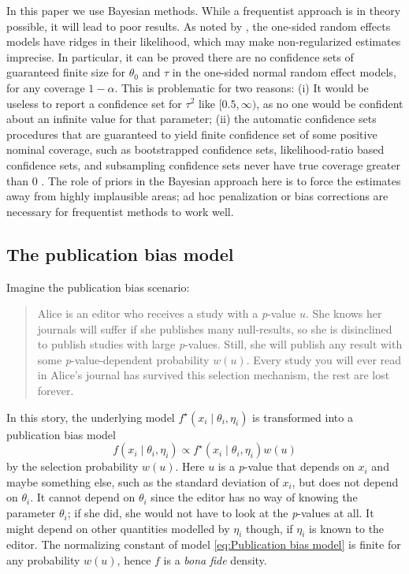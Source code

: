\documentclass{article}
\theoremstyle{plain}
\theoremstyle{definition}
\begin{document}
In this paper we use Bayesian methods. While a frequentist approach is in theory possible, it will lead to poor results. As noted by \citet[Appendix, 1]{mcshane2016adjusting}, the one-sided random effects models have ridges in their likelihood, which may make non-regularized estimates imprecise. In particular, it can be proved \citep{Moss2019} there are no confidence sets of guaranteed finite size for $\theta_{0}$ and $\tau$ in the one-sided normal random effect models, for any coverage $1-\alpha$. This is problematic for two reasons: (i) It would be useless to report a confidence set for $\tau^{2}$ like $[0.5,\infty)$, as no one would be confident about an infinite value for that parameter; (ii) the automatic confidence sets procedures that are guaranteed to yield finite confidence set of some positive nominal coverage, such as bootstrapped confidence sets, likelihood-ratio based confidence sets, and subsampling confidence sets never have true coverage greater than $0$ \citep[see][]{gleser996bootstrap, Moss2019}. The role of priors in the Bayesian approach here is to force the estimates away from highly implausible areas; ad hoc penalization or bias corrections are necessary for frequentist methods to work well.

\subsection{The publication bias model} \label{subsect:publicationBias}

Imagine the publication bias scenario:
\begin{quote}
Alice is an editor who receives a study with a \textit{p}-value $u$. She knows her journals will suffer if she publishes many null-results, so she is disinclined to publish studies with large \textit{p}-values. Still, she will publish any result with some \textit{p}-value-dependent probability $w(u)$. Every study you will ever read in Alice's journal has survived this selection mechanism, the rest are lost forever.
\end{quote}
In this story, the underlying model $f^{\star}(x_{i}\mid\theta_{i},\eta_{i})$
is transformed into a publication bias model
\begin{equation}
f(x_{i}\mid\theta_{i},\eta_{i})\propto f^{\star}(x_{i}\mid\theta_{i},\eta_{i})w(u)\label{eq:Publication bias model}
\end{equation}
by the selection probability $w(u)$. Here $u$ is a \textit{p}-value that depends on $x_{i}$ and maybe something else, such as the standard deviation of $x_{i}$, but does not depend on $\theta_{i}$. It cannot depend on $\theta_{i}$ since the editor has no way of knowing the parameter $\theta_{i}$; if she did, she would not have to look at the \textit{p}-values at all. It might depend on other quantities modelled by $\eta_{i}$ though, if $\eta_{i}$ is known to the editor. The normalizing constant of model \eqref{eq:Publication bias model} is finite for any probability $w(u)$, hence $f$ is a \textit{bona fide} density.
\end{document}
